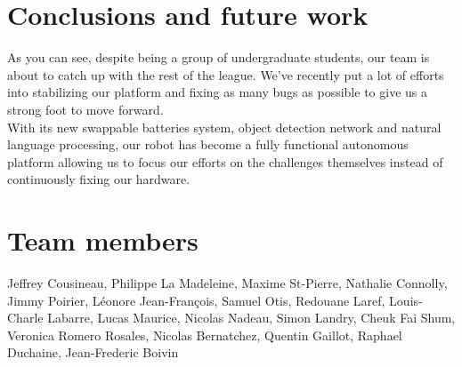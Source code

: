 \documentclass[runningheads,a4paper]{llncs}
\begin{document}
\section{Conclusions and future work} 
\tab As you can see, despite being a group of undergraduate students, our team is about to catch up with the rest of the league. We’ve recently put a lot of efforts into stabilizing our platform and fixing as many bugs as possible to give us a strong foot to move forward.\\

With its new swappable batteries system, object detection network and natural language processing, our robot has become a fully functional autonomous platform allowing us to focus our efforts on the challenges themselves instead of continuously fixing our hardware.
\\


	

\section*{Team members}
Jeffrey Cousineau, Philippe La Madeleine, Maxime St-Pierre, Nathalie Connolly, Jimmy Poirier, Léonore Jean-François, Samuel Otis, Redouane Laref, Louis-Charle Labarre, Lucas Maurice, Nicolas Nadeau, Simon Landry, Cheuk Fai Shum, Veronica Romero Rosales, Nicolas Bernatchez, Quentin Gaillot, Raphael Duchaine, Jean-Frederic Boivin 

\nocite{*}


\end{document}
